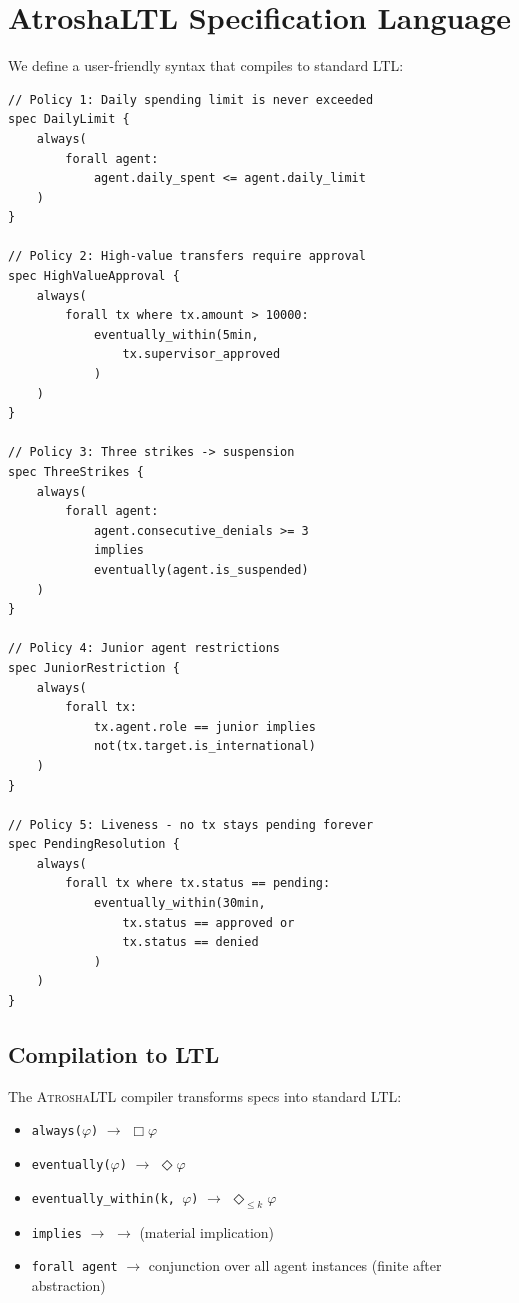 \documentclass{llncs}
\begin{document}
\section{AtroshaLTL Specification Language}

We define a user-friendly syntax that compiles to standard LTL:

\begin{lstlisting}[basicstyle=\ttfamily\small, frame=single]
// Policy 1: Daily spending limit is never exceeded
spec DailyLimit {
    always(
        forall agent:
            agent.daily_spent <= agent.daily_limit
    )
}

// Policy 2: High-value transfers require approval
spec HighValueApproval {
    always(
        forall tx where tx.amount > 10000:
            eventually_within(5min,
                tx.supervisor_approved
            )
    )
}

// Policy 3: Three strikes -> suspension
spec ThreeStrikes {
    always(
        forall agent:
            agent.consecutive_denials >= 3
            implies
            eventually(agent.is_suspended)
    )
}

// Policy 4: Junior agent restrictions
spec JuniorRestriction {
    always(
        forall tx:
            tx.agent.role == junior implies
            not(tx.target.is_international)
    )
}

// Policy 5: Liveness - no tx stays pending forever
spec PendingResolution {
    always(
        forall tx where tx.status == pending:
            eventually_within(30min,
                tx.status == approved or
                tx.status == denied
            )
    )
}
\end{lstlisting}

\subsection{Compilation to LTL}

The \textsc{AtroshaLTL} compiler transforms specs into standard LTL:

\begin{itemize}
    \item \texttt{always($\varphi$)} $\rightarrow$ $\Box \varphi$
    \item \texttt{eventually($\varphi$)} $\rightarrow$ $\Diamond \varphi$
    \item \texttt{eventually\_within(k, $\varphi$)} $\rightarrow$ $\Diamond_{\leq k} \varphi$
    \item \texttt{implies} $\rightarrow$ $\rightarrow$ (material implication)
    \item \texttt{forall agent} $\rightarrow$ conjunction over all agent instances (finite after abstraction)
\end{itemize}
\end{document}
